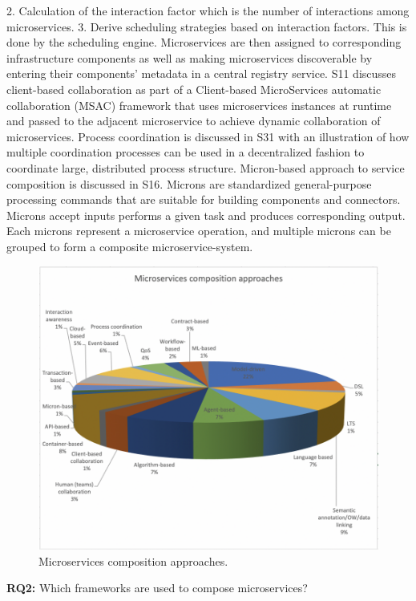 \documentclass{article}
\begin{document}
\begin{multicols}{2}
2. Calculation of the interaction factor which is the number of interactions among microservices. 3. Derive scheduling strategies based on interaction factors. This is done by the scheduling engine. Microservices are then assigned to corresponding infrastructure components as well as making microservices discoverable by entering their components’ metadata in a central registry service. 
S11 discusses client-based collaboration as part of a Client-based MicroServices automatic collaboration (MSAC) framework that uses microservices instances at runtime and passed to the adjacent microservice to achieve dynamic collaboration of microservices. Process coordination is discussed in S31 with an illustration of how multiple coordination processes can be used in a decentralized fashion to coordinate large, distributed process structure. Micron-based approach to service composition is discussed in S16. Microns are standardized general-purpose processing commands that are suitable for building components and connectors. Microns accept inputs performs a given task and produces corresponding output. Each microns represent a microservice operation, and multiple microns can be grouped to form a composite microservice-system. 

\begin{figure}[htbp]
 \centerline{\includegraphics[scale=0.60]{mscomappr.png}}
  \caption{Microservices composition approaches.}
  \label{fig}
\end{figure}

\textbf{RQ2:} Which frameworks are used to compose microservices?


\end{multicols}
\end{document}
